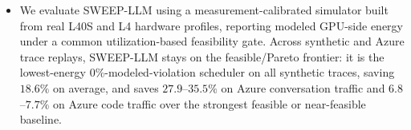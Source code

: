 \begin{itemize}
    \item We evaluate SWEEP-LLM using a measurement-calibrated simulator built from real L40S and L4 hardware profiles, reporting modeled GPU-side energy under a common utilization-based feasibility gate. Across synthetic and Azure trace replays, SWEEP-LLM stays on the feasible/Pareto frontier: it is the lowest-energy $0\%$-modeled-violation scheduler on all synthetic traces, saving $18.6\%$ on average, and saves $27.9$–$35.5\%$ on Azure conversation traffic and $6.8$–$7.7\%$ on Azure code traffic over the strongest feasible or near-feasible baseline.
\end{itemize}



